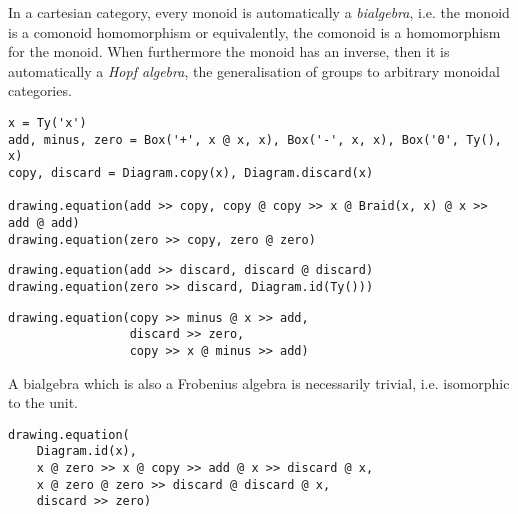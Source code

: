 \begin{example}
In a cartesian category, every monoid is automatically a \emph{bialgebra}, i.e. the monoid is a comonoid homomorphism or equivalently, the comonoid is a homomorphism for the monoid.
When furthermore the monoid has an inverse, then it is automatically a \emph{Hopf algebra}, the generalisation of groups to arbitrary monoidal categories.

\begin{verbatim}
x = Ty('x')
add, minus, zero = Box('+', x @ x, x), Box('-', x, x), Box('0', Ty(), x)
copy, discard = Diagram.copy(x), Diagram.discard(x)

drawing.equation(add >> copy, copy @ copy >> x @ Braid(x, x) @ x >> add @ add)
drawing.equation(zero >> copy, zero @ zero)
\end{verbatim}
\begin{center}
\hfill
{}
\end{center}
\begin{verbatim}
drawing.equation(add >> discard, discard @ discard)
drawing.equation(zero >> discard, Diagram.id(Ty()))
\end{verbatim}
\begin{center}
\hfill
{}
\end{center}
\begin{verbatim}
drawing.equation(copy >> minus @ x >> add,
                 discard >> zero,
                 copy >> x @ minus >> add)
\end{verbatim}

A bialgebra which is also a Frobenius algebra is necessarily trivial, i.e. isomorphic to the unit.

\begin{verbatim}
drawing.equation(
    Diagram.id(x),
    x @ zero >> x @ copy >> add @ x >> discard @ x,
    x @ zero @ zero >> discard @ discard @ x,
    discard >> zero)
\end{verbatim}

\end{example}

